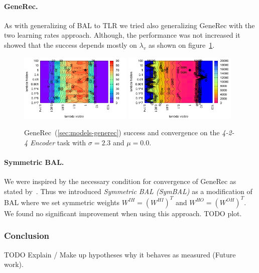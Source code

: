 \paragraph{GeneRec.} 
As with generalizing of BAL to TLR we tried also generalizing GeneRec with the two learning rates approach. Although, the performance was not increased it showed that the success depends mostly on $\lambda_v$ as shown on figure~\ref{fig:results-generec-auto4-performance}. 
\begin{figure}[H]
  \centering
  \includegraphics[width=0.48\textwidth]{img/generec-auto4-success.pdf}   
  \includegraphics[width=0.48\textwidth]{img/generec-auto4-epoch.pdf}     
  \caption{GeneRec~(\ref{sec:models-generec}) success and convergence on the \emph{4-2-4 Encoder} task with $\sigma = 2.3$ and $\mu = 0.0$.}
  \label{fig:results-generec-auto4-performance}
\end{figure}

\paragraph{Symmetric BAL.} 
\label{sec:our-bal-sym} 
We were inspired by the necessary condition for convergence of GeneRec as stated by~\citet{o1996bio}. Thus we introduced \emph{Symmetric BAL (SymBAL)} as a modification of BAL where we set symmetric weights $W^{IH} = (W^{HI})^T$ and $W^{HO} = (W^{OH})^T$. We found no significant improvement when using this approach. TODO plot. 

\subsubsection{Conclusion} 
\label{sec:tlr-auto4-conclusion} 

TODO Explain / Make up hypotheses why it behaves as measured (Future work). \\
